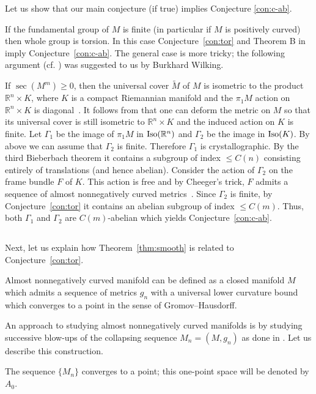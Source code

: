 \documentclass{amsart}
\begin{document}
Let us show that our main conjecture (if true) implies Conjecture \ref{con:c-ab}.

If the fundamental group of $M$ is finite (in particular if $M$ is positively curved) then whole group is torsion.
In this case Conjecture~\ref{con:tor} and Theorem B in \cite{KPT} imply Conjecture~\ref{con:c-ab}.
The general case is more tricky;
the following argument (cf. \cite[Corollary 4.6.1]{KPT}) was suggested to us by Burkhard Wilking.

If $\sec(M^m)\ge0$, then the universal cover $\tilde M$ of $M$ is isometric to the product $\mathbb{R}^n\times K$, where $K$ is a compact Riemannian manifold and the $\pi_1M$ action  on $\mathbb{R}^n\times K$ is diagonal~\cite{CG72}.
It follows from \cite[Cor. 6.3]{wilking} that one can deform the metric on $M$ so that its universal cover is still isometric to $\mathbb{R}^n\times K$ and the induced action on $K$ is finite. Let $\Gamma_1$ be the image of $\pi_1M$ in 
$\mathop{\rm Iso}(\mathbb{R}^n)$ and $\Gamma_2$ be the image in $\mathop{\rm Iso}(K)$. By above we can assume that $\Gamma_2$ is finite. Therefore $\Gamma_1$ is crystallographic. By the third Bieberbach theorem it contains a subgroup of index $\le C(n)$ consisting entirely of translations (and hence abelian).
Consider the action of $\Gamma_2$ on the frame bundle $F$ of $K$. This action is free and by Cheeger's trick, $F$ admits a sequence of almost nonnegatively curved metrics~\cite{FY}. Since $\Gamma_2$ is finite, by Conjecture~\ref{con:tor} it contains 
an abelian subgroup of index $\le C(m)$. Thus, both $\Gamma_1$ and $\Gamma_2$ are $C(m)$-abelian which  yields Conjecture~\ref{con:c-ab}.

\subsection{} Next, let us explain  how Theorem~\ref{thm:smooth} is related to Conjecture~\ref{con:tor}.

Almost nonnegatively curved manifold can be defined as a closed manifold $M$ which admits a sequence of metrics $g_n$ with a universal lower curvature bound which converges to a point in the sense of Gromov--Hausdorff.

An approach to studying almost nonnegatively curved manifolds is by studying successive blow-ups of the collapsing sequence $M_n=(M,g_n)$ as done in \cite[Section 4.3]{KPT}.
Let us describe this construction.

The sequence $\{M_n\}$ converges to a point; this one-point space will be denoted by $A_0$.
\end{document}
